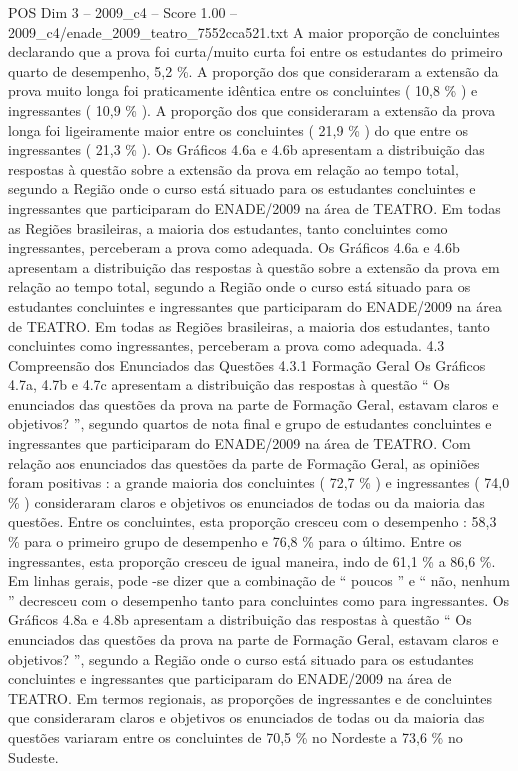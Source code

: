 \begin{textsample}{POS Dim 3 – 2009\_c4 – Score 1.00 – 2009\_c4/enade\_2009\_teatro\_7552cca521.txt}
A maior proporção de concluintes declarando que a prova foi curta/muito curta foi entre os estudantes do primeiro quarto de desempenho, 5,2 \%.
A proporção dos que consideraram a extensão da prova muito longa foi praticamente idêntica entre os concluintes ( 10,8 \% ) e ingressantes ( 10,9 \% ).
A proporção dos que consideraram a extensão da prova longa foi ligeiramente maior entre os concluintes ( 21,9 \% ) do que entre os ingressantes ( 21,3 \% ).
Os Gráficos 4.6a e 4.6b apresentam a distribuição das respostas à questão sobre a extensão da prova em relação ao tempo total, segundo a Região onde o curso está situado para os estudantes concluintes e ingressantes que participaram do ENADE/2009 na área de TEATRO.
Em todas as Regiões brasileiras, a maioria dos estudantes, tanto concluintes como ingressantes, perceberam a prova como adequada.
Os Gráficos 4.6a e 4.6b apresentam a distribuição das respostas à questão sobre a extensão da prova em relação ao tempo total, segundo a Região onde o curso está situado para os estudantes concluintes e ingressantes que participaram do ENADE/2009 na área de TEATRO.
Em todas as Regiões brasileiras, a maioria dos estudantes, tanto concluintes como ingressantes, perceberam a prova como adequada. 4.3 Compreensão dos Enunciados das Questões 4.3.1 Formação Geral Os Gráficos 4.7a, 4.7b e 4.7c apresentam a distribuição das respostas à questão “ Os enunciados das questões da prova na parte de Formação Geral, estavam claros e objetivos? ”, segundo quartos de nota final e grupo de estudantes concluintes e ingressantes que participaram do ENADE/2009 na área de TEATRO.
Com relação aos enunciados das questões da parte de Formação Geral, as opiniões foram positivas : a grande maioria dos concluintes ( 72,7 \% ) e ingressantes ( 74,0 \% ) consideraram claros e objetivos os enunciados de todas ou da maioria das questões.
Entre os concluintes, esta proporção cresceu com o desempenho : 58,3 \% para o primeiro grupo de desempenho e 76,8 \% para o último.
Entre os ingressantes, esta proporção cresceu de igual maneira, indo de 61,1 \% a 86,6 \%.
Em linhas gerais, pode -se dizer que a combinação de “ poucos ” e “ não, nenhum ” decresceu com o desempenho tanto para concluintes como para ingressantes.
Os Gráficos 4.8a e 4.8b apresentam a distribuição das respostas à questão “ Os enunciados das questões da prova na parte de Formação Geral, estavam claros e objetivos? ”, segundo a Região onde o curso está situado para os estudantes concluintes e ingressantes que participaram do ENADE/2009 na área de TEATRO.
Em termos regionais, as proporções de ingressantes e de concluintes que consideraram claros e objetivos os enunciados de todas ou da maioria das questões variaram entre os concluintes de 70,5 \% no Nordeste a 73,6 \% no Sudeste.

\end{textsample}
